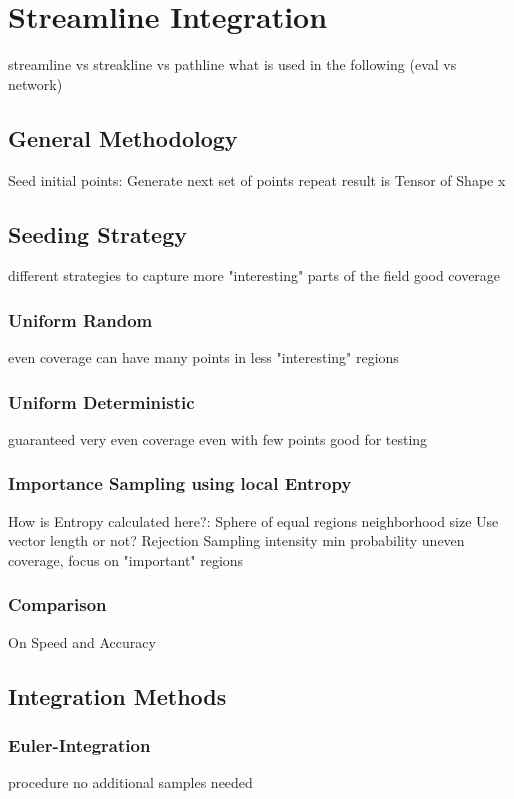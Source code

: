
\chapter{Streamline Integration}\label{chapter:streamlines}
streamline vs streakline vs pathline
what is used in the following (eval vs network)
\section{General Methodology}
Seed initial points:
Generate next set of points
repeat
result is Tensor of Shape x
\section{Seeding Strategy}
different strategies to capture more "interesting" parts of the field
good coverage
\subsection{Uniform Random}
even coverage
can have many points in less "interesting" regions
\subsection{Uniform Deterministic}
guaranteed very even coverage even with few points
good for testing
\subsection{Importance Sampling using local Entropy}
How is Entropy calculated here?:
  Sphere of equal regions
  neighborhood size
  Use vector length or not?
Rejection Sampling
  intensity
  min probability
uneven coverage, focus on "important" regions
\subsection{Comparison}
On Speed and Accuracy

\section{Integration Methods}

\subsection{Euler-Integration}
procedure
no additional samples needed
